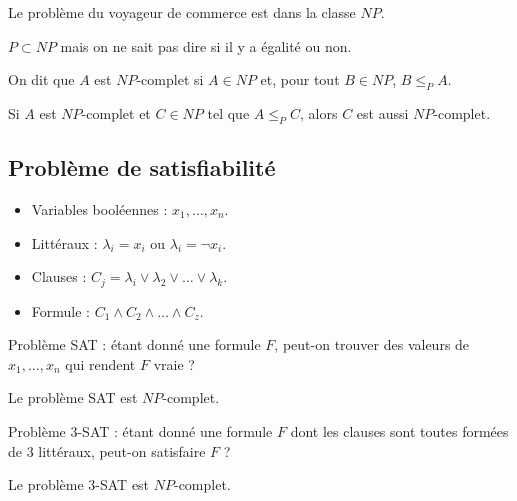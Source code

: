 \documentclass[a4paper,10pt,twocolumn]{article}
\begin{document}
		\begin{pop}
		Le problème du voyageur de commerce est dans la classe $NP$.
		\end{pop}

		\begin{rem}
		$P \subset NP$ mais on ne sait pas dire si il y a égalité ou non.
		\end{rem}

		\begin{defn}
		On dit que $A$ est $NP$-complet si $A \in NP$ et, pour tout $B \in NP$, $B \leq_P A$.
		\end{defn}

		\begin{pop}
		Si $A$ est $NP$-complet et $C \in NP$ tel que $A \leq_P C$, alors $C$ est aussi $NP$-complet.
		\end{pop}

	\subsection{Problème de satisfiabilité}

		\begin{voc}
			\begin{itemize}
			\item Variables booléennes : $x_1,\ldots,x_n$.
			\item Littéraux : $\lambda_i = x_i$ ou $\lambda_i = \neg x_i$.
			\item Clauses : $C_j = \lambda_i \vee \lambda_2 \vee \ldots \vee \lambda_k$.
			\item Formule : $C_1 \wedge C_2 \wedge \ldots \wedge C_z$.
			\end{itemize}
		\end{voc}

		\begin{defn}
		Problème SAT : étant donné une formule $F$, peut-on trouver des valeurs de $x_1,\ldots,x_n$ qui rendent $F$ vraie ?
		\end{defn}

		\begin{thm}
		Le problème SAT est $NP$-complet.
		\end{thm}

		\begin{defn}
		Problème 3-SAT : étant donné une formule $F$ dont les clauses sont toutes formées de 3 littéraux, peut-on satisfaire $F$ ?
		\end{defn}

		\begin{thm}
		Le problème 3-SAT est $NP$-complet.
		\end{thm}
		
\end{document}
